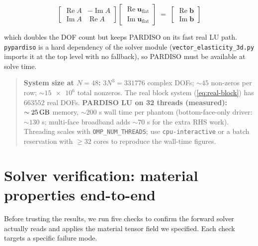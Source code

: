 \documentclass[11pt,letterpaper]{article}
\newenvironment{grayb}{\par\medskip\noindent\begin{quote}\small}{\end{quote}\medskip}
\newcommand{\vect}[1]{\boldsymbol{#1}}
\begin{document}
\begin{equation}
\boxed{\;
\begin{bmatrix} \operatorname{Re} A & -\operatorname{Im} A \\
                \operatorname{Im} A &  \operatorname{Re} A \end{bmatrix}
\begin{bmatrix} \operatorname{Re}\vect u_{\mathrm{flat}} \\
                \operatorname{Im}\vect u_{\mathrm{flat}} \end{bmatrix}
\;=\;
\begin{bmatrix} \operatorname{Re}\vect b \\
                \operatorname{Im}\vect b \end{bmatrix}
\;}
\label{eq:real-block}
\end{equation}

which doubles the DOF count but keeps PARDISO on its fast real LU
path. \texttt{pypardiso} is a hard dependency of the solver module
(\texttt{vector\_elasticity\_3d.py} imports it at the top level with
no fallback), so PARDISO must be available at solve time.

\begin{grayb}
\textbf{System size at $N = 48$:} $3 N^{3} = \num{331776}$ complex
DOFs; $\sim 45$ non-zeros per row; $\sim \num{15e6}$ total nonzeros.
The real block system (\ref{eq:real-block}) has $\num{663552}$ real
DOFs.
\textbf{PARDISO LU on 32 threads (measured):}
$\sim \SI{25}{\giga\byte}$ memory, $\sim 200$ s wall time per phantom
(bottom-face-only driver: $\sim 130$ s; multi-face broadband adds
$\sim 70$ s for the extra RHS work).
Threading scales with \texttt{OMP\_NUM\_THREADS}; use
\texttt{cpu-interactive} or a batch reservation with $\ge\!32$ cores
to reproduce the wall-time figures.
\end{grayb}

\section{Solver verification: material properties end-to-end}
\label{sec:verification}

Before trusting the results, we run five checks to confirm the
forward solver actually reads and applies the material tensor field
we specified. Each check targets a specific failure mode.
\end{document}

